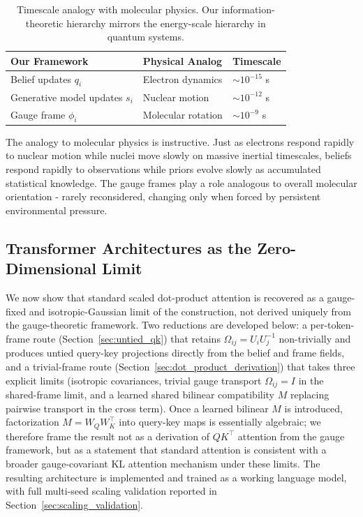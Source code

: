\documentclass[11pt]{article}
\begin{document}
\begin{table}[h]
\centering
\begin{tabular}{|l|l|l|}
\hline
\textbf{Our Framework} & \textbf{Physical Analog} & \textbf{Timescale} \\
\hline
Belief updates $q_i$ & Electron dynamics & $\sim 10^{-15}$ s \\
Generative model updates $s_i$ & Nuclear motion & $\sim 10^{-12}$ s \\
Gauge frame $\phi_i$ & Molecular rotation & $\sim 10^{-9}$ s \\
\hline
\end{tabular}
\caption{Timescale analogy with molecular physics. Our information-theoretic hierarchy mirrors the energy-scale hierarchy in quantum systems.}
\end{table}

The analogy to molecular physics is instructive. Just as electrons respond rapidly to nuclear motion while nuclei move slowly on massive inertial timescales, beliefs respond rapidly to observations while priors evolve slowly as accumulated statistical knowledge. The gauge frames play a role analogous to overall molecular orientation - rarely reconsidered, changing only when forced by persistent environmental pressure.

\subsection{Transformer Architectures as the Zero-Dimensional Limit}
\label{sec:transformers}

We now show that standard scaled dot-product attention is recovered as a gauge-fixed and isotropic-Gaussian limit of the construction, not derived uniquely from the gauge-theoretic framework. Two reductions are developed below: a per-token-frame route (Section~\ref{sec:untied_qk}) that retains $\Omega_{ij} = U_iU_j^{-1}$ non-trivially and produces untied query-key projections directly from the belief and frame fields, and a trivial-frame route (Section~\ref{sec:dot_product_derivation}) that takes three explicit limits (isotropic covariances, trivial gauge transport $\Omega_{ij} = I$ in the shared-frame limit, and a learned shared bilinear compatibility $M$ replacing pairwise transport in the cross term). Once a learned bilinear $M$ is introduced, factorization $M = W_QW_K^\top$ into query-key maps is essentially algebraic; we therefore frame the result not as a derivation of $QK^\top$ attention from the gauge framework, but as a statement that standard attention is consistent with a broader gauge-covariant KL attention mechanism under these limits. The resulting architecture is implemented and trained as a working language model, with full multi-seed scaling validation reported in Section~\ref{sec:scaling_validation}.
\end{document}

